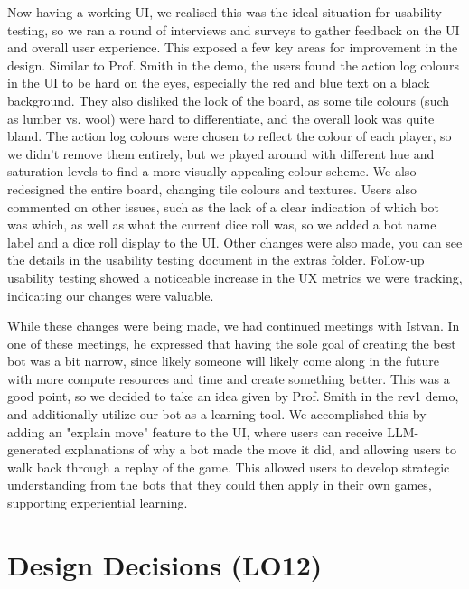 \documentclass{article}
\begin{document}
Now having a working UI, we realised this was the ideal situation for usability testing, so we
ran a round of interviews and surveys to gather feedback on the UI and overall user experience.
This exposed a few key areas for improvement in the design.
Similar to Prof. Smith in the demo, the users found the action log colours in the UI to be hard on the eyes,
especially the red and blue text on a black background.
They also disliked the look of the board, as some tile colours (such as lumber vs. wool) were hard to differentiate,
and the overall look was quite bland.
The action log colours were chosen to reflect the colour of each player, so we didn't remove them entirely,
but we played around with different hue and saturation levels to find a more visually appealing colour scheme.
We also redesigned the entire board, changing tile colours and textures.
Users also commented on other issues, such as the lack of a clear indication of which bot was which, as well
as what the current dice roll was, so we added a bot name label and a dice roll display to the UI.
Other changes were also made, you can see the details in the usability testing document in the extras folder.
Follow-up usability testing showed a noticeable increase in the UX metrics we were tracking, indicating our
changes were valuable.

While these changes were being made, we had continued meetings with Istvan.
In one of these meetings, he expressed that having the sole goal of creating the best bot was a bit narrow,
since likely someone will likely come along in the future with more compute resources and time and create
something better.
This was a good point, so we decided to take an idea given by Prof. Smith in the rev1 demo,
and additionally utilize our bot as a learning tool.
We accomplished this by adding an "explain move" feature to the UI,
where users can receive LLM-generated explanations of why a bot made the move it did, and allowing users
to walk back through a replay of the game.
This allowed users to develop strategic understanding from the bots that they could then apply in
their own games, supporting experiential learning.

\section{Design Decisions (LO12)}

\end{document}
